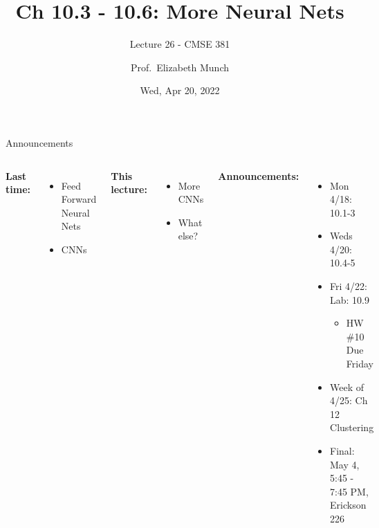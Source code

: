 \documentclass[aspectratio=169,usenames,dvipsnames]{beamer}
\begin{document}
\title[]{Ch 10.3 - 10.6: More Neural Nets}
\subtitle{Lecture 26 - CMSE 381}
\date{Wed, Apr 20, 2022}



\author[Dr.~Munch]{Prof.~Elizabeth Munch}

\begin{frame}
 \titlepage


\end{frame}
\begin{frame}[c]{Announcements }

\begin{columns}
\centering

	\textbf{Last time:}
	\begin{itemize}
	\item Feed Forward Neural Nets
	\item CNNs
	\end{itemize}

	\vspace{.2in}

	\textbf{This lecture:}
	\begin{itemize}
		\item More CNNs
		\item What else?
\end{itemize}


\centering

\textbf{Announcements:}
	\begin{itemize}
	\item Mon 4/18: 10.1-3
	\item Weds 4/20: 10.4-5
	\item Fri 4/22: Lab: 10.9
	\begin{itemize}
		\item HW \#10 Due Friday
	\end{itemize}
	\item Week of 4/25: Ch 12 Clustering
	\item Final: May 4, 5:45 - 7:45 PM, Erickson 226

	\end{itemize}
\end{columns}

\end{frame}
\end{document}
